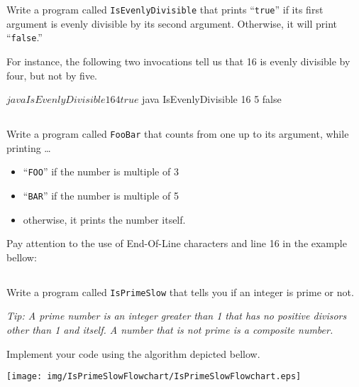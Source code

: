 \documentclass[a4paper, 12pt]{article}
\begin{document}
Write a program called \texttt{IsEvenlyDivisible} that prints ``\texttt{true}''
if its first argument is evenly divisible by its second argument. Otherwise, it
will print ``\texttt{false}.''

For instance, the following two invocations tell us that 16 is evenly divisible
by four, but not by five.

\begin{cmd}
$ java IsEvenlyDivisible 16 4
true
$ java IsEvenlyDivisible 16 5
false
\end{cmd}


\subsection{}

Write a program called \texttt{FooBar} that counts from one up to its argument,
while printing \ldots

\begin{itemize}
  \item ``\texttt{FOO}'' if the number is multiple of 3
  \item ``\texttt{BAR}'' if the number is multiple of 5
  \item otherwise, it prints the number itself.
\end{itemize}

Pay attention to the use of End-Of-Line characters and line 16 in the example
bellow:



\subsection{}

Write a program called \texttt{IsPrimeSlow} that tells you if an integer is
prime or not.

\textsl{Tip: A \emph{prime} number is an integer greater than 1 that has no
positive divisors other than 1 and itself. A number that is not prime is a
\emph{composite} number.}

Implement your code using the algorithm depicted bellow.

\begin{center}
  \texttt{[image: img/IsPrimeSlowFlowchart/IsPrimeSlowFlowchart.eps]}
\end{center}
\vspace{1cm}
\end{document}
